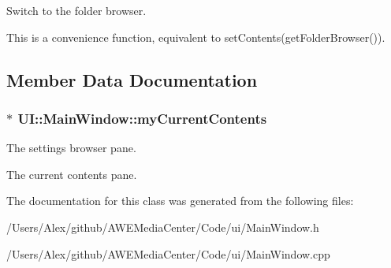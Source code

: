 Switch to the folder browser. 

This is a convenience function, equivalent to {\ttfamily set\-Contents(get\-Folder\-Browser())}. 

\subsection{Member Data Documentation}
\hypertarget{class_u_i_1_1_main_window_aa4469cc686fa831df2a34dc82e6a8b92}{
\subsubsection[{my\-Current\-Contents}]{$\ast$ U\-I\-::\-Main\-Window\-::my\-Current\-Contents\hspace{0.3cm}{\ttfamily [private]}}}\label{class_u_i_1_1_main_window_aa4469cc686fa831df2a34dc82e6a8b92}


The settings browser pane. 

The current contents pane. 

The documentation for this class was generated from the following files\-:\begin{DoxyCompactItemize}
\item 
/\-Users/\-Alex/github/\-A\-W\-E\-Media\-Center/\-Code/ui/Main\-Window.\-h\item 
/\-Users/\-Alex/github/\-A\-W\-E\-Media\-Center/\-Code/ui/Main\-Window.\-cpp\end{DoxyCompactItemize}
